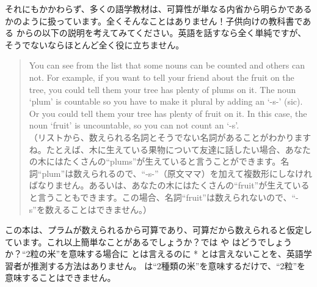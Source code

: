 それにもかかわらず、多くの語学教材は、可算性が単なる内省から明らかであるかのように扱っています。全くそんなことはありません！子供向けの教科書である \citet{allen2008} からの以下の説明を考えてみてください。英語を話すなら全く単純ですが、そうでないならほとんど全く役に立ちません。

\begin{quote}
    You can see from the list that some nouns can be counted and others can not. For example, if you want to tell your friend about the fruit on the tree, you could tell them your tree has plenty of plums on it. The noun `plum' is countable so you have to make it plural by adding an `-s-' (sic). Or you could tell them your tree has plenty of fruit on it. In this case, the noun `fruit' is uncountable, so you can not count an `-s'. \citet[1]{allen2008}\\
    （リストから、数えられる名詞とそうでない名詞があることがわかりますね。たとえば、木に生えている果物について友達に話したい場合、あなたの木にはたくさんの\enquote{plums}が生えていると言うことができます。名詞\enquote{plum}は数えられるので、\enquote{-s-}（原文ママ）を加えて複数形にしなければなりません。あるいは、あなたの木にはたくさんの\enquote{fruit}が生えていると言うこともできます。この場合、名詞\enquote{fruit}は数えられないので、\enquote{-s}を数えることはできません。）
\end{quote}

この本は、プラムが数えられるから可算であり、可算だから数えられると仮定しています。これ以上簡単なことがあるでしょうか？では  や  はどうでしょうか？\enquote{2粒の米}を意味する場合に  とは言えるのに * とは言えないことを、英語学習者が推測する方法はありません。 は\enquote{2種類の米}を意味するだけで、\enquote{2粒}を意味することはできません。

